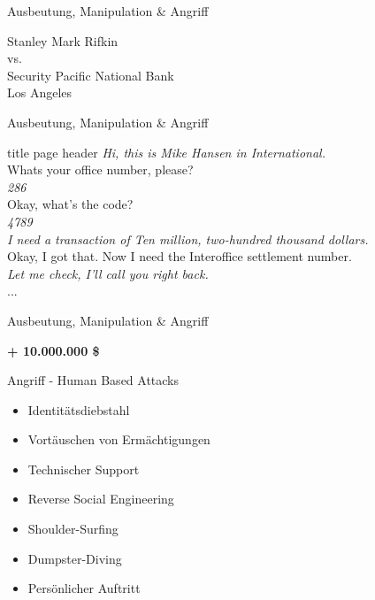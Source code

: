 \documentclass[11pt]{beamer}
\begin{document}
\begin{frame}{Ausbeutung, Manipulation \& Angriff}
  \begin{center}
  {\Large
  Stanley Mark Rifkin\\
  vs.\\
  Security Pacific National Bank\\
  Los Angeles
  }
  \end{center}
\end{frame}

\begin{frame}{Ausbeutung, Manipulation \& Angriff}

\begin{beamercolorbox}[sep=1em]{title page header}
\textcolor{skyblue3}{\textit{\glqq{}Hi, this is Mike Hansen in International.\grqq{}}}\\

\glqq{}Whats your office number, please?\grqq{}\\

\textcolor{skyblue3}{\textit{\glqq{}286\grqq{}}}\\

\glqq{}Okay, what's the code?\grqq{}\\

\textcolor{skyblue3}{\textit{\glqq{}4789\grqq{}}}\\

\textcolor{skyblue3}{\textit{\glqq{}I need a transaction of Ten million, two-hundred thousand
dollars.\grqq{}}}\\

\glqq{}Okay, I got that. Now I need the Interoffice settlement number.\grqq{}\\

\textcolor{skyblue3}{\textit{\glqq{}Let me check, I'll call you right
back.\grqq{}}}\\
...

\end{beamercolorbox}
\end{frame}

\begin{frame}{Ausbeutung, Manipulation \& Angriff}
  \begin{center}
  {\Huge \textbf{+ 10.000.000 \$}}
  \end{center}
\end{frame}

\begin{frame}{Angriff - Human Based Attacks}
  \begin{itemize}
    \item Identitätsdiebstahl
    \item Vortäuschen von Ermächtigungen
    \item Technischer Support
    \item Reverse Social Engineering
    \item Shoulder-Surfing
    \item Dumpster-Diving
    \item Persönlicher Auftritt
  \end{itemize}
\end{frame}
\end{document}

